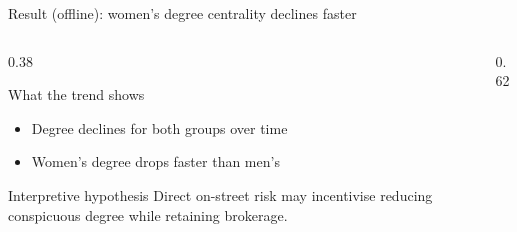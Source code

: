 \begin{frame}{Result (offline): women's degree centrality declines faster}
  \small
  \begin{columns}[T,onlytextwidth]
    \begin{column}{0.38\textwidth}
      \begin{block}{What the trend shows}
        \begin{itemize}
          \item Degree declines for both groups over time
          \item Women's degree drops faster than men's
        \end{itemize}
      \end{block}

      \begin{exampleblock}{Interpretive hypothesis}
        Direct on-street risk may incentivise reducing conspicuous degree while retaining brokerage.
      \end{exampleblock}
    \end{column}

    \begin{column}{0.62\textwidth}
    \end{column}
  \end{columns}

\end{frame}


